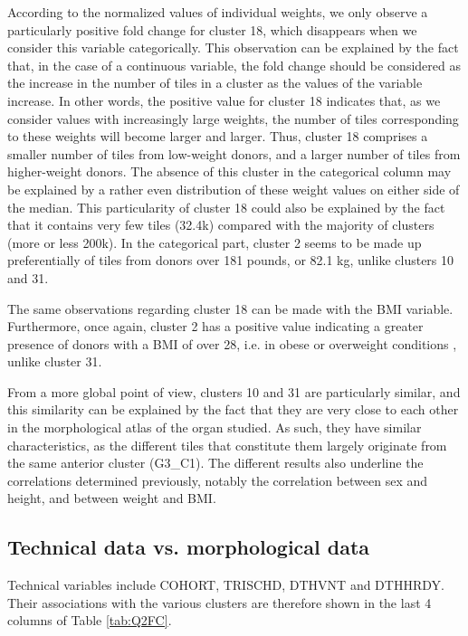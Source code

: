\documentclass[a4paper, 11pt]{article}
\begin{document}
\begin{multicols}{2}
According to the normalized values of individual weights, we only observe a particularly positive fold change for cluster 18, which disappears when we consider this variable categorically. This observation can be explained by the fact that, in the case of a continuous variable, the fold change should be considered as the increase in the number of tiles in a cluster as the values of the variable increase. In other words, the positive value for cluster 18 indicates that, as we consider values with increasingly large weights, the number of tiles corresponding to these weights will become larger and larger. Thus, cluster 18 comprises a smaller number of tiles from low-weight donors, and a larger number of tiles from higher-weight donors. The absence of this cluster in the categorical column may be explained by a rather even distribution of these weight values on either side of the median. This particularity of cluster 18 could also be explained by the fact that it contains very few tiles (32.4k) compared with the majority of clusters (more or less 200k). In the categorical part, cluster 2 seems to be made up preferentially of tiles from donors over 181 pounds, or 82.1 kg, unlike clusters 10 and 31.

The same observations regarding cluster 18 can be made with the BMI variable. Furthermore, once again, cluster 2 has a positive value indicating a greater presence of donors with a BMI of over 28, i.e. in obese or overweight conditions \citep{cdc_all_2022}, unlike cluster 31.

From a more global point of view, clusters 10 and 31 are particularly similar, and this similarity can be explained by the fact that they are very close to each other in the morphological atlas of the organ studied. As such, they have similar characteristics, as the different tiles that constitute them largely originate from the same anterior cluster (G3\_C1). The different results also underline the correlations determined previously, notably the correlation between sex and height, and between weight and BMI.

\subsection{Technical data vs. morphological data}

Technical variables include COHORT, TRISCHD, DTHVNT and DTHHRDY. Their associations with the various clusters are therefore shown in the last 4 columns of Table \ref{tab:Q2FC}. 


\end{multicols}
\end{document}
